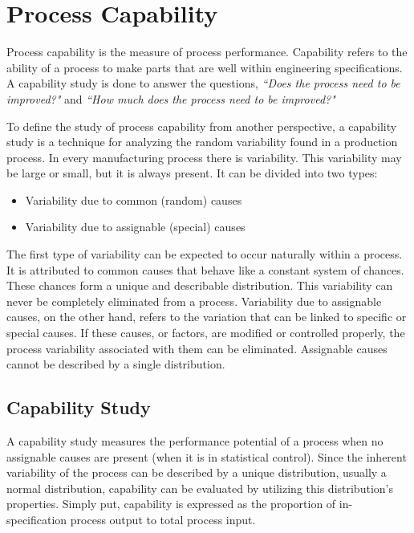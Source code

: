 \documentclass[]{article}
\begin{document}
\section{Process Capability}
Process capability is the measure of process performance. Capability refers to the ability of a process to make parts that are well within engineering specifications. A capability study is done to answer the questions, \textit{``Does the process need to be improved?"} and  \textit{``How much does the process need to be improved?"}

To define the study of process capability from another perspective, a capability study is a technique for analyzing the random variability found in a production process. In every manufacturing process there is variability. This variability may be large or small, but it is always present. It can be divided into two types:

\begin{itemize}
\item Variability due to common (random) causes
\item Variability due to assignable (special) causes
\end{itemize}
The first type of variability can be expected to occur naturally within a process. It is attributed to common causes that behave like a constant system of chances. These chances form a unique and describable distribution. This variability can never be completely eliminated from a process. Variability due to assignable causes, on the other hand, refers to the variation that can be linked to specific or special causes. If these causes, or factors, are modified or controlled properly, the process variability associated with them can be eliminated. Assignable causes cannot be described by a single distribution.
\newpage
\subsection{Capability Study} 
A capability study measures the performance potential of a process when no assignable causes are present (when it is in statistical control). Since the inherent variability of the process can be described by a unique distribution, usually a normal distribution, capability can be evaluated by utilizing this distribution’s properties. Simply put, capability is expressed as the proportion of in-specification process output to total process input.
\end{document}
